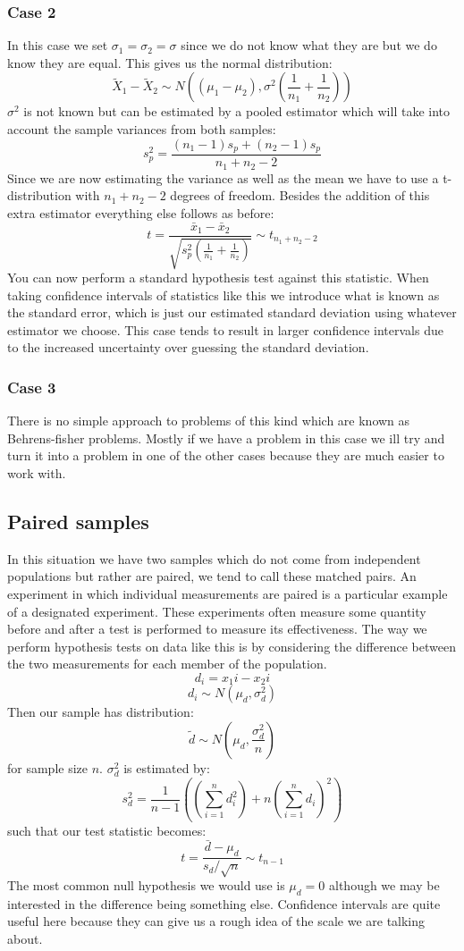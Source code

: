 \documentclass[12pt]{article}
\begin{document}
\subsubsection*{Case 2}
In this case we set \(\sigma_1=\sigma_2=\sigma\) since we do not know what they are but we do know they are equal. This gives us the normal distribution:
\[\tilde{X}_1-\tilde{X}_2\sim N\left((\mu_1-\mu_2),\sigma^2\left(\frac{1}{n_1}+\frac{1}{n_2}\right)\right)\]
\(\sigma^2\) is not known but can be estimated by a pooled estimator which will take into account the sample variances from both samples:
\[s_p^2=\frac{(n_1-1)s_p+(n_2-1)s_p}{n_1+n_2-2}\]
Since we are now estimating the variance as well as the mean we have to use a t-distribution with \(n_1+n_2-2\) degrees of freedom. Besides the addition of this extra estimator everything else follows as before:
\[t=\frac{\bar{x}_1-\bar{x}_2}{\sqrt{s_p^2\left(\frac{1}{n_1}+\frac{1}{n_2}\right)}}\sim t_{n_1+n_2-2}\]
You can now perform a standard hypothesis test against this statistic. When taking confidence intervals of statistics like this we introduce what is known as the standard error, which is just our estimated standard deviation using whatever estimator we choose. This case tends to result in larger confidence intervals due to the increased uncertainty over guessing the standard deviation.
\subsubsection*{Case 3}
There is no simple approach to problems of this kind which are known as Behrens-fisher problems. Mostly if we have a problem in this case we ill try and turn it into a problem in one of the other cases because they are much easier to work with.
\subsection*{Paired samples}
In this situation we have two samples which do not come from independent populations but rather are paired, we tend to call these matched pairs. An experiment in which individual measurements are paired is a particular example of a designated experiment. These experiments often measure some quantity before and after a test is performed to measure its effectiveness. The way we perform hypothesis tests on data like this is by considering the difference between the two measurements for each member of the population.
\[d_i=x_1{i}-x_2{i}\]
\[d_i\sim N(\mu_d,\sigma^2_d)\]
Then our sample has distribution:
\[\tilde{d}\sim N(\mu_d,\frac{\sigma^2_d}{n})\]
for sample size \(n\). \(\sigma^2_d\) is estimated by:
\[s^2_d=\frac{1}{n-1}\left(\left(\sum^n_{i=1}d_i^2\right)+n\left(\sum^n_{i=1}d_i\right)^2\right)\]
such that our test statistic becomes:
\[t=\frac{\bar{d}-\mu_d}{s_d/\sqrt{n}}\sim t_{n-1}\]
The most common null hypothesis we would use is \(\mu_d=0\) although we may be interested in the difference being something else. Confidence intervals are quite useful here because they can give us a rough idea of the scale we are talking about.
\end{document}
